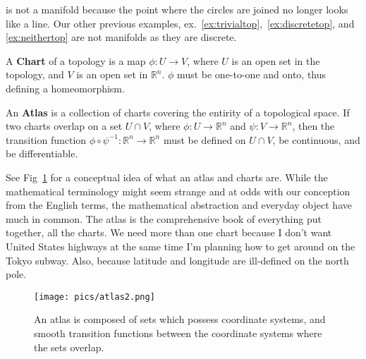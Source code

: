 \begin{center}
\end{center}

  is not a manifold because the point where the circles are joined no longer looks like a line.  Our other previous examples, ex.~\ref{ex:trivialtop},~\ref{ex:discretetop}, and \ref{ex:neithertop} are not manifolds as they are discrete.

\begin{definition}
  A \textbf{Chart} of a topology is a map $\phi: U \rightarrow V$, where $U$ is an open set in the topology, and $V$ is an open set in $\mathbb{R}^n$.   $\phi$ must be one-to-one and onto, thus defining a homeomorphism.
\end{definition}

\begin{definition}[Atlas]
  An \textbf{Atlas} is a collection of charts covering the entirity of a topological space.  If two charts overlap on a set $U \cap V$, where $\phi:U\rightarrow \mathbb{R}^n$ and $\psi:V\rightarrow \mathbb{R}^n$, then the transition function $\phi \circ \psi^{-1}: \mathbb{R}^n \rightarrow \mathbb{R}^n$ must be defined on $U\cap V$, be continuous, and be differentiable.
\end{definition}

See Fig~\ref{fig:atlas} for a conceptual idea of what an atlas and charts are.  While the mathematical terminology might seem strange and at odds with our conception from the English terms, the mathematical abstraction and everyday object have much in common.  The atlas is the comprehensive book of everything put together, all the charts.  We need more than one chart because I don't want United States highways at the same time I'm planning how to get around on the Tokyo subway.  Also, because latitude and longitude are ill-defined on the north pole.


\begin{figure}
  \texttt{[image: pics/atlas2.png]}
  \caption{An atlas is composed of sets which possess coordinate systems, and smooth transition functions between the coordinate systems where the sets overlap.}
    \label{fig:atlas}
\end{figure}
